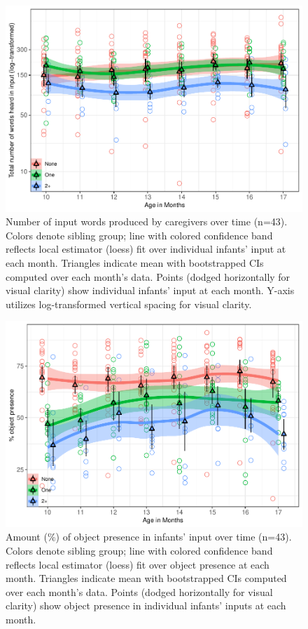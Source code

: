 \documentclass[
  man,mask,floatsintext]{apa6}
\begin{document}
\begin{figure}
\centering
\includegraphics{SiblingsStudy_SupplementaryData-anon-revisions_files/figure-latex/Figure-input-age-1.pdf}
\caption{\label{fig:Figure-input-age}Number of input words produced by caregivers over time (n=43). Colors denote sibling group; line with colored confidence band reflects local estimator (loess) fit over individual infants' input at each month. Triangles indicate mean with bootstrapped CIs computed over each month's data. Points (dodged horizontally for visual clarity) show individual infants' input at each month. Y-axis utilizes log-transformed vertical spacing for visual clarity.}
\end{figure}

\begin{figure}
\centering
\includegraphics{SiblingsStudy_SupplementaryData-anon-revisions_files/figure-latex/Figure-OP-age-1.pdf}
\caption{\label{fig:Figure-OP-age}Amount (\%) of object presence in infants' input over time (n=43). Colors denote sibling group; line with colored confidence band reflects local estimator (loess) fit over object presence at each month. Triangles indicate mean with bootstrapped CIs computed over each month's data. Points (dodged horizontally for visual clarity) show object presence in individual infants' inputs at each month.}
\end{figure}
\end{document}
